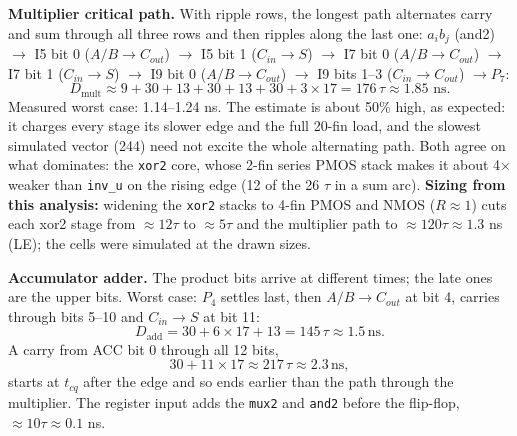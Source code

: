 \documentclass[10pt,letterpaper]{article}
\newcommand{\code}[1]{\texttt{#1}}
\begin{document}
\textbf{Multiplier critical path.} With ripple rows, the longest path alternates carry and sum through all three rows and then ripples along the last one: $a_ib_j$ (and2) $\to$ I5 bit 0 ($A/B\to C_{out}$) $\to$ I5 bit 1 ($C_{in}\to S$) $\to$ I7 bit 0 ($A/B\to C_{out}$) $\to$ I7 bit 1 ($C_{in}\to S$) $\to$ I9 bit 0 ($A/B\to C_{out}$) $\to$ I9 bits 1--3 ($C_{in}\to C_{out}$) $\to P_7$:
\[ D_{\text{mult}}\approx 9+30+13+30+13+30+3\times17=176\,\tau\approx1.85\text{ ns}. \]
Measured worst case: 1.14--1.24 ns. The estimate is about 50\% high, as expected: it charges every stage its slower edge and the full 20-fin load, and the slowest simulated vector (244) need not excite the whole alternating path. Both agree on what dominates: the \code{xor2} core, whose 2-fin series PMOS stack makes it about 4$\times$ weaker than \code{inv\_u} on the rising edge (12 of the 26 $\tau$ in a sum arc). \textbf{Sizing from this analysis:} widening the \code{xor2} stacks to 4-fin PMOS and NMOS ($R\approx1$) cuts each xor2 stage from $\approx12\tau$ to $\approx5\tau$ and the multiplier path to $\approx120\tau\approx1.3$ ns (LE); the cells were simulated at the drawn sizes.

\textbf{Accumulator adder.} The product bits arrive at different times; the late ones are the upper bits. Worst case: $P_4$ settles last, then $A/B\to C_{out}$ at bit 4, carries through bits 5--10 and $C_{in}\to S$ at bit 11:
\[
D_{\mathrm{add}}=30+6\times17+13=145\,\tau\approx1.5\,\mathrm{ns}.
\]
A carry from ACC bit 0 through all 12 bits,
\[
30+11\times17\approx217\,\tau\approx2.3\,\mathrm{ns},
\]
starts at $t_{cq}$ after the edge and so ends earlier than the path through the multiplier. The register input adds the \code{mux2} and \code{and2} before the flip-flop, $\approx10\tau\approx0.1$ ns.
\end{document}
